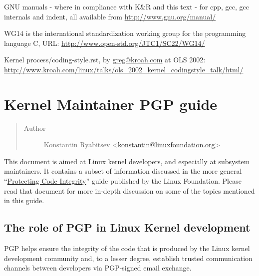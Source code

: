 \documentclass[a4paper,8pt,english]{sphinxmanual}
\begin{document}
GNU manuals - where in compliance with K\&R and this text - for cpp, gcc,
gcc internals and indent, all available from \href{http://www.gnu.org/manual/}{http://www.gnu.org/manual/}

WG14 is the international standardization working group for the programming
language C, URL: \href{http://www.open-std.org/JTC1/SC22/WG14/}{http://www.open-std.org/JTC1/SC22/WG14/}

Kernel process/coding-style.rst, by \href{mailto:greg@kroah.com}{greg@kroah.com} at OLS 2002:
\href{http://www.kroah.com/linux/talks/ols\_2002\_kernel\_codingstyle\_talk/html/}{http://www.kroah.com/linux/talks/ols\_2002\_kernel\_codingstyle\_talk/html/}


\chapter{Kernel Maintainer PGP guide}
\label{process/maintainer-pgp-guide:kernel-maintainer-pgp-guide}\label{process/maintainer-pgp-guide::doc}\label{process/maintainer-pgp-guide:pgpguide}\begin{quote}\begin{description}
\item[{Author}] \leavevmode
Konstantin Ryabitsev \textless{}\href{mailto:konstantin@linuxfoundation.org}{konstantin@linuxfoundation.org}\textgreater{}

\end{description}\end{quote}

This document is aimed at Linux kernel developers, and especially at
subsystem maintainers. It contains a subset of information discussed in
the more general ``\href{https://github.com/lfit/itpol/blob/master/protecting-code-integrity.md}{Protecting Code Integrity}'' guide published by the
Linux Foundation. Please read that document for more in-depth discussion
on some of the topics mentioned in this guide.


\section{The role of PGP in Linux Kernel development}
\label{process/maintainer-pgp-guide:protecting-code-integrity}\label{process/maintainer-pgp-guide:the-role-of-pgp-in-linux-kernel-development}
PGP helps ensure the integrity of the code that is produced by the Linux
kernel development community and, to a lesser degree, establish trusted
communication channels between developers via PGP-signed email exchange.
\end{document}
